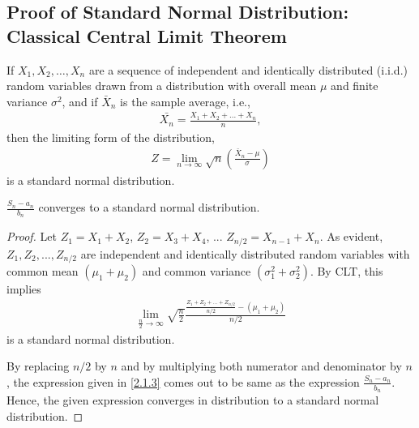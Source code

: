 \documentclass[journal,12pt,twocolumn]{IEEEtran}
\begin{document}
\subsection{Proof of Standard Normal Distribution: Classical Central Limit Theorem}
\begin{theorem}
If ${\textstyle X_{1},X_{2},\dots ,X_{n}}$ are a sequence of independent and identically distributed (i.i.d.) random variables drawn from a distribution with overall mean ${\textstyle \mu }$ and finite variance ${\textstyle \sigma ^{2}}$, and if ${\textstyle {\bar {X}}_{n}}$ is the sample average, i.e.,
\begin{align}
   \bar{X_n}=\frac{X_1+X_2+...+X_n}{n}, 
\end{align}
then the limiting form of the distribution,
\begin{align}
    {\textstyle Z=\lim _{n\to \infty }{\sqrt {n}}{\left({\frac {{\bar {X}}_{n}-\mu }{\sigma }}\right)}}\label{2.1.2}
\end{align}
is a standard normal distribution.
\end{theorem}
\begin{corollary}
$\frac{S_n-a_n}{b_n}$ converges to a standard normal distribution.
\end{corollary}
\begin{proof}
Let $Z_1=X_1+X_2$, $Z_2=X_3+X_4$, ... $Z_{n/2}=X_{n-1}+X_n$. As evident, $Z_1,Z_2,...,Z_{n/2}$ are independent and identically distributed random variables with common mean $(\mu_1+\mu_2)$ and common variance $(\sigma_1^2+\sigma_2^2)$.
By CLT, this implies
\begin{align}
    \lim_{\frac{n}{2}\to\infty}\sqrt{\frac{n}{2}}\frac{\frac{Z_1+Z_2+...+Z_{n/2}}{n/2}-(\mu_1+\mu_2)}{n/2}\label{2.1.3}
\end{align}
is a standard normal distribution.\par
By replacing $n/2$ by $n$ and by multiplying both numerator and denominator by $n$, the expression given in \eqref{2.1.3} comes out to be same as the expression $\frac{S_n-a_n}{b_n}$. Hence, the given expression converges in distribution to a standard normal distribution.
\end{proof}
\end{document}
